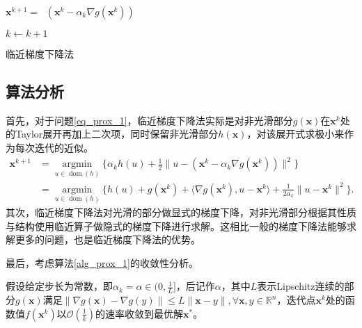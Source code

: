\begin{algorithm}

    \SetAlgoLined

     {
        $\bm{x}^{k+1} = \mathop{\mathrm{prox_{\alpha_{k} h}}}(\bm{x}^{k} - \alpha_{k}\nabla g(\bm{x}^{k}))$

        $k \leftarrow k+1$
    }
    \caption{临近梯度下降法}
    \label{alg_prox_1}
\end{algorithm}

\subsection{算法分析}

首先，对于问题\ref{eq_prox_1}，临近梯度下降法实际是对非光滑部分$g(\bm{x})$在$\bm{x}^{k}$处的Taylor展开再加上二次项，同时保留非光滑部分$h(\bm{x})$，对该展开式求极小来作为每次迭代的近似。
\begin{equation}
    \begin{split}
        \bm{x}^{k+1} &=  \mathop{\mathrm{argmin}}\limits_{u\in \mathop{\mathrm{dom}} (h)}\{\alpha_{k}h(u) + \frac{1}{2}\|u-(\bm{x}^{k}-\alpha_{k}\nabla g(\bm{x}^{k}))\|^{2}\} \\
                &= \mathop{\mathrm{argmin}}\limits_{u\in \mathop{\mathrm{dom}} (h)} \{h(u)+g(\bm{x}^{k})+\langle \nabla g(\bm{x}^{k}), u-\bm{x}^{k} \rangle + \frac{1}{2\alpha_{k}}\|u-\bm{x}^{k}\|^{2}\}.
    \end{split}
    \nonumber
\end{equation}
其次，临近梯度下降法对光滑的部分做显式的梯度下降，对非光滑部分根据其性质与结构使用临近算子做隐式的梯度下降进行求解。这相比一般的梯度下降法能够求解更多的问题，也是临近梯度下降法的优势。

最后，考虑算法\ref{alg_prox_1}的收敛性分析。

\begin{theorem}
    假设给定步长为常数，即$\alpha_{k}=\alpha\in (0, \frac{1}{L}]$，后记作$\alpha$，其中$L$表示Lipschitz连续的部分$g(\bm{x})$满足$\|\nabla g(\bm{x})-\nabla g(y)\| \leq L\|\bm{x}-y\|, \forall \bm{x}, y \in \mathbb{R}^{n}$，迭代点$\bm{x}^{k}$处的函数值$f(\bm{x}^{k})$以$\mathcal{O}(\frac{1}{k})$的速率收敛到最优解$\bm{x}^{*}$。
\end{theorem}

